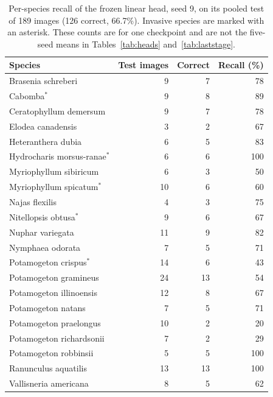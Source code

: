 \documentclass[final,3p,times,twocolumn]{elsarticle}
\begin{document}
\begin{table}[!ht]
    \centering
    \caption{Per-species recall of the frozen linear head, seed 9, on its pooled test of 189 images (126 correct, 66.7\%). Invasive species are marked with an asterisk. These counts are for one checkpoint and are not the five-seed means in Tables~\ref{tab:heads} and~\ref{tab:laststage}.}
    \label{tab:recall}
    \renewcommand{\arraystretch}{1.05}
    \small
    \begin{tabular}{lrrr}
        \hline
        \textbf{Species} & \textbf{Test images} & \textbf{Correct} & \textbf{Recall (\%)} \\
        \hline
        Brasenia schreberi & 9 & 7 & 78 \\
        Cabomba$^{*}$ & 9 & 8 & 89 \\
        Ceratophyllum demersum & 9 & 7 & 78 \\
        Elodea canadensis & 3 & 2 & 67 \\
        Heteranthera dubia & 6 & 5 & 83 \\
        Hydrocharis morsus-ranae$^{*}$ & 6 & 6 & 100 \\
        Myriophyllum sibiricum & 6 & 3 & 50 \\
        Myriophyllum spicatum$^{*}$ & 10 & 6 & 60 \\
        Najas flexilis & 4 & 3 & 75 \\
        Nitellopsis obtusa$^{*}$ & 9 & 6 & 67 \\
        Nuphar variegata & 11 & 9 & 82 \\
        Nymphaea odorata & 7 & 5 & 71 \\
        Potamogeton crispus$^{*}$ & 14 & 6 & 43 \\
        Potamogeton gramineus & 24 & 13 & 54 \\
        Potamogeton illinoensis & 12 & 8 & 67 \\
        Potamogeton natans & 7 & 5 & 71 \\
        Potamogeton praelongus & 10 & 2 & 20 \\
        Potamogeton richardsonii & 7 & 2 & 29 \\
        Potamogeton robbinsii & 5 & 5 & 100 \\
        Ranunculus aquatilis & 13 & 13 & 100 \\
        Vallisneria americana & 8 & 5 & 62 \\
        \hline
    \end{tabular}
\end{table}
\end{document}
